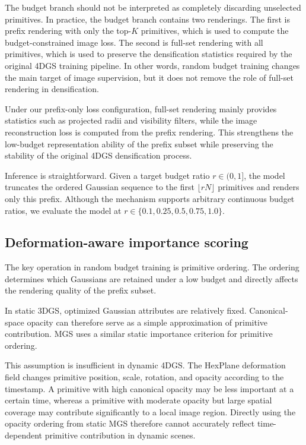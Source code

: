 \documentclass[pdflatex,sn-mathphys]{sn-jnl}
\begin{document}
The budget branch should not be interpreted as completely discarding unselected primitives. In practice, the budget branch contains two renderings. The first is prefix rendering with only the top-$K$ primitives, which is used to compute the budget-constrained image loss. The second is full-set rendering with all primitives, which is used to preserve the densification statistics required by the original 4DGS training pipeline. In other words, random budget training changes the main target of image supervision, but it does not remove the role of full-set rendering in densification.

Under our prefix-only loss configuration, full-set rendering mainly provides statistics such as projected radii and visibility filters, while the image reconstruction loss is computed from the prefix rendering. This strengthens the low-budget representation ability of the prefix subset while preserving the stability of the original 4DGS densification process.

Inference is straightforward. Given a target budget ratio $r \in (0,1]$, the model truncates the ordered Gaussian sequence to the first $\lfloor rN \rfloor$ primitives and renders only this prefix. Although the mechanism supports arbitrary continuous budget ratios, we evaluate the model at $r \in \{0.1,0.25,0.5,0.75,1.0\}$.

\subsection{Deformation-aware importance scoring}
\label{sec:importance}

The key operation in random budget training is primitive ordering. The ordering determines which Gaussians are retained under a low budget and directly affects the rendering quality of the prefix subset.

In static 3DGS, optimized Gaussian attributes are relatively fixed. Canonical-space opacity can therefore serve as a simple approximation of primitive contribution. MGS uses a similar static importance criterion for primitive ordering.

This assumption is insufficient in dynamic 4DGS. The HexPlane deformation field changes primitive position, scale, rotation, and opacity according to the timestamp. A primitive with high canonical opacity may be less important at a certain time, whereas a primitive with moderate opacity but large spatial coverage may contribute significantly to a local image region. Directly using the opacity ordering from static MGS therefore cannot accurately reflect time-dependent primitive contribution in dynamic scenes.
\end{document}
